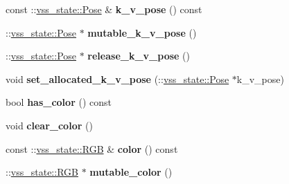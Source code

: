 \begin{DoxyCompactItemize}
\item 
const \+::\hyperlink{classvss__state_1_1Pose}{vss\+\_\+state\+::\+Pose} \& {\bfseries k\+\_\+v\+\_\+pose} () const \hypertarget{classvss__state_1_1Robot__State_a0a9ad2ef6674cccffbacad19391d04ec}{}\label{classvss__state_1_1Robot__State_a0a9ad2ef6674cccffbacad19391d04ec}

\item 
\+::\hyperlink{classvss__state_1_1Pose}{vss\+\_\+state\+::\+Pose} $\ast$ {\bfseries mutable\+\_\+k\+\_\+v\+\_\+pose} ()\hypertarget{classvss__state_1_1Robot__State_a75c61cf61895be92975d7cbbb96e9a2b}{}\label{classvss__state_1_1Robot__State_a75c61cf61895be92975d7cbbb96e9a2b}

\item 
\+::\hyperlink{classvss__state_1_1Pose}{vss\+\_\+state\+::\+Pose} $\ast$ {\bfseries release\+\_\+k\+\_\+v\+\_\+pose} ()\hypertarget{classvss__state_1_1Robot__State_a2d609ff6aaaa1093aa4fd1194c1e1d9c}{}\label{classvss__state_1_1Robot__State_a2d609ff6aaaa1093aa4fd1194c1e1d9c}

\item 
void {\bfseries set\+\_\+allocated\+\_\+k\+\_\+v\+\_\+pose} (\+::\hyperlink{classvss__state_1_1Pose}{vss\+\_\+state\+::\+Pose} $\ast$k\+\_\+v\+\_\+pose)\hypertarget{classvss__state_1_1Robot__State_adf1f7422433e9fa210b97a3a257dd5d3}{}\label{classvss__state_1_1Robot__State_adf1f7422433e9fa210b97a3a257dd5d3}

\item 
bool {\bfseries has\+\_\+color} () const \hypertarget{classvss__state_1_1Robot__State_a319868975523f46fce84fedda26c478e}{}\label{classvss__state_1_1Robot__State_a319868975523f46fce84fedda26c478e}

\item 
void {\bfseries clear\+\_\+color} ()\hypertarget{classvss__state_1_1Robot__State_a0d95199c67056fd8a0b6bb873d278392}{}\label{classvss__state_1_1Robot__State_a0d95199c67056fd8a0b6bb873d278392}

\item 
const \+::\hyperlink{classvss__state_1_1RGB}{vss\+\_\+state\+::\+R\+GB} \& {\bfseries color} () const \hypertarget{classvss__state_1_1Robot__State_a1e8b02c137ceae1f7a875bdf5371aa91}{}\label{classvss__state_1_1Robot__State_a1e8b02c137ceae1f7a875bdf5371aa91}

\item 
\+::\hyperlink{classvss__state_1_1RGB}{vss\+\_\+state\+::\+R\+GB} $\ast$ {\bfseries mutable\+\_\+color} ()\hypertarget{classvss__state_1_1Robot__State_aa91b85fa199de6f9b4673529f86f1d01}{}\label{classvss__state_1_1Robot__State_aa91b85fa199de6f9b4673529f86f1d01}


\end{DoxyCompactItemize}
